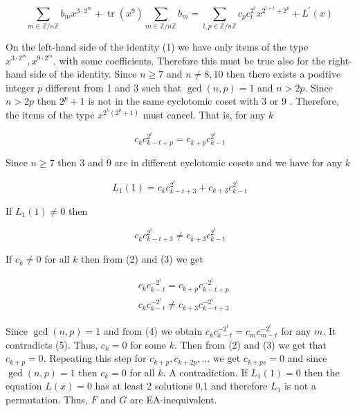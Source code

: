 \documentclass[10pt]{article}
\begin{document}
\begin{equation*}
\sum_{m \in \mathbb{Z} / n \mathbb{Z}} b_{m} x^{3 \cdot 2^{m}}+\operatorname{tr}\left(x^{9}\right) \sum_{m \in \mathbb{Z} / n \mathbb{Z}} b_{m}=\sum_{l, p \in \mathbb{Z} / n \mathbb{Z}} c_{p} c_{l}^{2^{t}} x^{2^{l+t}+2^{p}}+L^{\prime}(x) \tag{1}
\end{equation*}


On the left-hand side of the identity (1) we have only items of the type $x^{3 \cdot 2^{m}}, x^{9 \cdot 2^{m}}$, with some coefficients. Therefore this must be true also for the right-hand side of the identity. Since $n \geqslant 7$ and $n \neq 8,10$ then there exists a positive integer $p$ different from 1 and 3 such that $\operatorname{gcd}(n, p)=1$ and $n>2 p$. Since $n>2 p$ then $2^{p}+1$ is not in the same cyclotomic coset with 3 or 9 . Therefore, the items of the type $x^{2^{k}\left(2^{p}+1\right)}$ must cancel. That is, for any $k$


\begin{equation*}
c_{k} c_{k-t+p}^{2^{t}}=c_{k+p} c_{k-t}^{2^{t}} \tag{2}
\end{equation*}


Since $n \geqslant 7$ then 3 and 9 are in different cyclotomic cosets and we have for any $k$

$$
L_{1}(1)=c_{k} c_{k-t+3}^{2^{t}}+c_{k+3} c_{k-t}^{2^{t}}
$$

If $L_{1}(1) \neq 0$ then


\begin{equation*}
c_{k} c_{k-t+3}^{2^{t}} \neq c_{k+3} c_{k-t}^{2^{t}} \tag{3}
\end{equation*}


If $c_{k} \neq 0$ for all $k$ then from (2) and (3) we get


\begin{align*}
& c_{k} c_{k-t}^{-2^{t}}=c_{k+p} c_{k-t+p}^{-2^{t}}  \tag{4}\\
& c_{k} c_{k-t}^{-2^{t}} \neq c_{k+3} c_{k-t+3}^{-2^{t}} \tag{5}
\end{align*}


Since $\operatorname{gcd}(n, p)=1$ and from (4) we obtain $c_{k} c_{k-t}^{-2^{t}}=c_{m} c_{m-t}^{-2^{t}}$ for any $m$. It contradicts (5). Thus, $c_{k}=0$ for some $k$. Then from (2) and (3) we get that $c_{k+p}=0$. Repeating this step for $c_{k+p}, c_{k+2 p}, \ldots$ we get $c_{k+p s}=0$ and since $\operatorname{gcd}(n, p)=1$ then $c_{k}=0$ for all $k$. A contradiction. If $L_{1}(1)=0$ then the equation $L(x)=0$ has at least 2 solutions 0,1 and therefore $L_{1}$ is not a permutation. Thus, $F$ and $G$ are EA-inequivalent.
\end{document}
